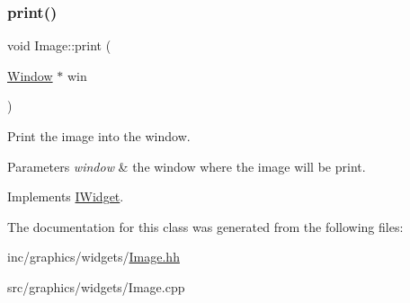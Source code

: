 \subsubsection{\texorpdfstring{print()}{print()}}
{\footnotesize\ttfamily void Image\+::print (\begin{DoxyParamCaption}\item[{\hyperlink{classWindow}{Window} $\ast$}]{win }\end{DoxyParamCaption})\hspace{0.3cm}{\ttfamily [virtual]}}



Print the image into the window. 


\begin{DoxyParams}{Parameters}
{\em \textquotesingle{}window\textquotesingle{}} & the window where the image will be print. \\
\hline
\end{DoxyParams}


Implements \hyperlink{classIWidget_a0cfa49a402e9bb31808a715e048ab2f4}{I\+Widget}.



The documentation for this class was generated from the following files\+:\begin{DoxyCompactItemize}
\item 
inc/graphics/widgets/\hyperlink{Image_8hh}{Image.\+hh}\item 
src/graphics/widgets/Image.\+cpp\end{DoxyCompactItemize}
